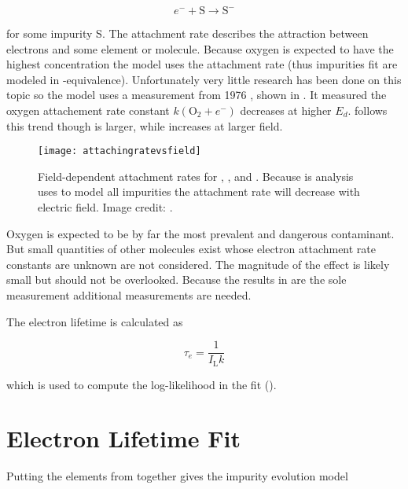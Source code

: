 \vspace{-15pt}

\begin{equation}
e^- + \mathrm{S} \rightarrow \mathrm{S^-}
\end{equation}

\vspace{-10pt}

\noindent for some impurity S.  The attachment rate describes the attraction between electrons and some element or molecule.  Because
oxygen is expected to have the highest concentration the model uses the  attachment rate (thus impurities fit are modeled
in -equivalence).  Unfortunately very little research has been done on this topic so the model uses a measurement from
1976 , shown in .  It measured the oxygen attachement rate
constant $k(\mathrm{O_2} + e^-)$ decreases at higher $E_d$.   follows this trend though is larger, while
 increases at larger field.

\begin{figure}
\centering
\texttt{[image: attachingratevsfield]}
\caption{Field-dependent attachment rates for , , and .  Because is analysis uses  to model all
impurities the attachment rate will decrease with electric field.  Image credit: .}
\label{fig:electron_lifetime_model_field_attaching_rate}
\end{figure}

Oxygen is expected to be by far the most prevalent and dangerous contaminant.  But small
quantities of other molecules exist whose electron attachment rate constants are unknown are not considered.  The magnitude of the effect
is likely small but should not be overlooked.  Because the results in  are
the sole measurement additional measurements are needed.

The electron lifetime is calculated as

\begin{equation}
\tau_e = \frac{1}{I_{\mathrm{L}} k}
\label{eq:electron_lifetime_model_field_lifetime}
\end{equation}

\noindent which is used to compute the log-likelihood in the fit ().



\section{Electron Lifetime Fit}
\label{sec:elifetime_fit}
Putting the elements from  together gives the impurity evolution model

